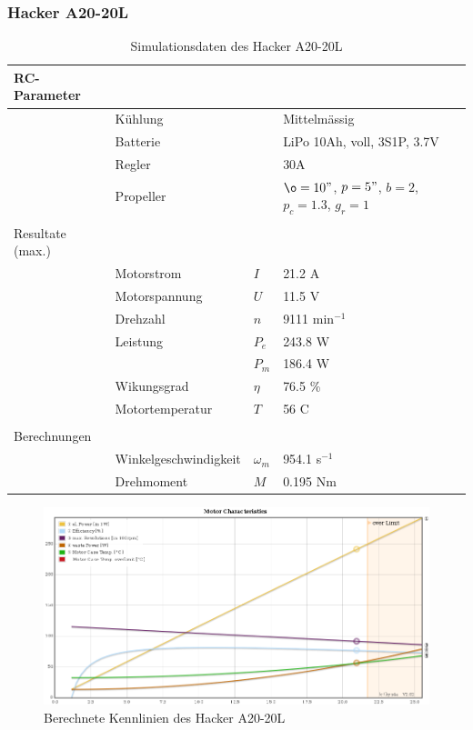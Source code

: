 \subsubsection*{Hacker A20-20L}

\begin{table}[h!]
	\centering
	\begin{tabular}{l l l l}
		RC-Parameter & & & \\ \hline
			& Kühlung	& & Mittelmässig \\
			& Batterie	& & LiPo 10Ah, voll, 3S1P, 3.7V \\
			& Regler	& & 30A \\
			& Propeller	& & $\o=10"$, $p=5"$, $b=2$, $p_c=1.3$, $g_r=1$ \\
			& & & \\
		Resultate (max.) & & & \\ \hline
			& Motorstrom	& $I$	& 21.2 A \\
			& Motorspannung	& $U$	& 11.5 V \\
			& Drehzahl	& $n$	& 9111 min$^{-1}$ \\
			& Leistung 	& $P_e$	& 243.8 W \\
			&		& $P_m$	& 186.4 W \\
			& Wikungsgrad	& $\eta$& 76.5 \% \\
			& Motortemperatur
					& $T$	& 56 C \\
			& & & \\
		Berechnungen & & & \\ \hline
			& Winkelgeschwindigkeit
					& $\omega_m$	& 954.1 s$^{-1}$ \\
			& Drehmoment	& $M$		& 0.195 Nm
	\end{tabular}
	\caption{Simulationsdaten des Hacker A20-20L}
\end{table}

\begin{figure}[h!]
	\centering
	\includegraphics[width=1\textwidth]{../../fig/motor/ecalc_A20-20L.png}
	\caption{Berechnete Kennlinien des Hacker A20-20L}
	\label{fig:ecalc_A20-20L}
\end{figure}
